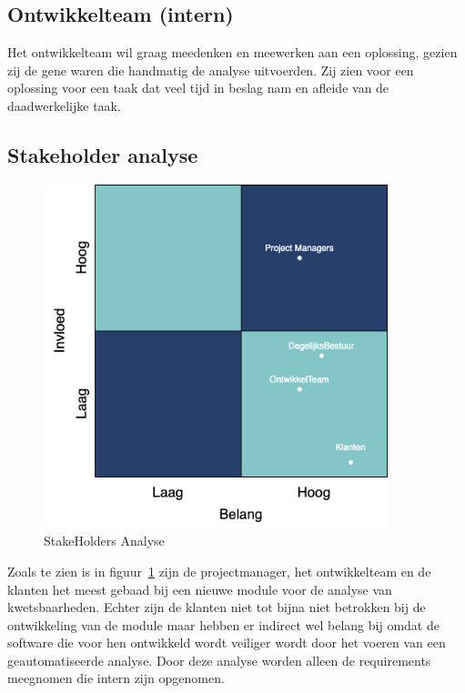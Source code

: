 \subsection{Ontwikkelteam (intern)}\label{subsec:ontwikkelteam-(intern)}
Het ontwikkelteam wil graag meedenken en meewerken aan een oplossing, gezien zij de gene waren die handmatig de analyse uitvoerden.
Zij zien voor een oplossing voor een taak dat veel tijd in beslag nam en afleide van de daadwerkelijke taak.

\subsection{Stakeholder analyse}\label{subsec:stakeholder-analyse}
\begin{figure}[H]
\myfloatalign
\includegraphics[width=10cm]{gfx/stakeholderanalyse}
\caption{StakeHolders Analyse}
\label{fig:StakeholderAnalyse}
\end{figure}
Zoals te zien is in figuur~\ref{fig:StakeholderAnalyse} zijn de projectmanager, het ontwikkelteam en de klanten het meest gebaad bij een nieuwe module voor de analyse van kwetsbaarheden.
Echter zijn de klanten niet tot bijna niet betrokken bij de ontwikkeling van de module maar hebben er indirect wel belang bij omdat de software die voor hen ontwikkeld wordt veiliger wordt door het voeren van een geautomatiseerde analyse.
Door deze analyse worden alleen de requirements meegnomen die intern zijn opgenomen.
